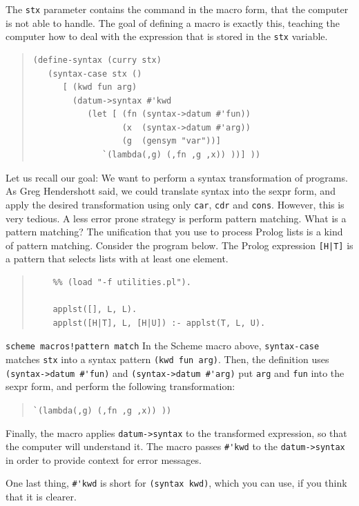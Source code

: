 \documentclass[a4paper,12pt]{book}
\begin{document}
The \verb|stx| parameter contains the command in the
macro form, that the computer is not able to handle.
The goal of defining a macro is exactly this, teaching
the computer how to deal with the expression that is
stored in the \verb|stx| variable.
\begin{quote}
\begin{verbatim}
(define-syntax (curry stx)
   (syntax-case stx ()
      [ (kwd fun arg)
        (datum->syntax #'kwd
           (let [ (fn (syntax->datum #'fun))
                  (x  (syntax->datum #'arg))
                  (g  (gensym "var"))]
              `(lambda(,g) (,fn ,g ,x)) ))] ))
\end{verbatim}
\end{quote}
Let us recall our goal: We want to perform a syntax
transformation of programs. As Greg Hendershott said,
we could translate syntax into the sexpr form, and
apply the desired transformation using only \verb|car|,
\verb|cdr| and \verb|cons|. However, this is very
tedious. A less error prone strategy is perform pattern
matching. What is a pattern matching? The unification
that you use to process Prolog lists is a kind of pattern
matching. Consider the program below. The Prolog expression
\verb/[H|T]/ is a pattern that selects lists with at least
one element.
\begin{quote}
	\begin{verbatim}
	%% (load "-f utilities.pl").

	applst([], L, L).
	applst([H|T], L, [H|U]) :- applst(T, L, U).
	\end{verbatim}
\end{quote}\verb|scheme macros!pattern match|
In the Scheme macro above, \verb|syntax-case| matches
\verb|stx| into a syntax pattern \verb|(kwd fun arg)|.
Then, the definition uses \verb|(syntax->datum #'fun)|
and \verb|(syntax->datum #'arg)| put \verb|arg| and
\verb|fun| into the sexpr form, and perform the
following transformation:
\begin{quote}
\verb|`(lambda(,g) (,fn ,g ,x)) ))|
\end{quote}
Finally, the macro applies \verb|datum->syntax| to the
transformed expression, so that the computer will
understand it. The macro passes \verb|#'kwd| to the
\verb|datum->syntax| in order to provide context for
error messages.

One last thing, \verb|#'kwd| is short for \verb|(syntax kwd)|,
which you can use, if you think that it is clearer.
\end{document}
